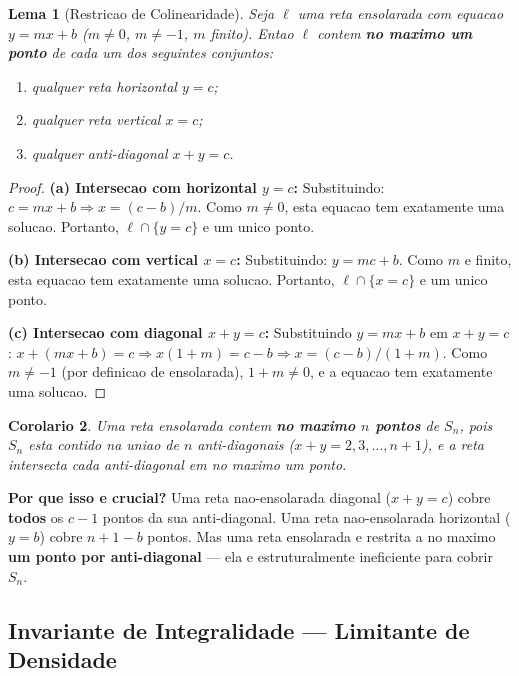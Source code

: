 \documentclass[5p]{elsarticle}
\newtheorem{lemma}{Lema}[section]
\newtheorem{corollary}[lemma]{Corolario}
\theoremstyle{definition}
\begin{document}
\begin{lemma}[Restricao de Colinearidade]\label{lem:restrict}
  Seja $\ell$ uma reta ensolarada com equacao $y = mx + b$ ($m \neq 0$, $m \neq -1$,
  $m$ finito). Entao $\ell$ contem \textbf{no maximo um ponto} de cada um dos seguintes
  conjuntos:
  \begin{enumerate}[label=(\alph*)]
    \item qualquer reta horizontal $y = c$;
    \item qualquer reta vertical $x = c$;
    \item qualquer anti-diagonal $x+y = c$.
  \end{enumerate}
\end{lemma}

\begin{proof}
  \textbf{(a) Intersecao com horizontal $y = c$:}
  Substituindo: $c = mx + b \Rightarrow x = (c-b)/m$. Como $m \neq 0$, esta equacao
  tem exatamente uma solucao. Portanto, $\ell \cap \{y = c\}$ e um unico ponto.

  \textbf{(b) Intersecao com vertical $x = c$:}
  Substituindo: $y = mc + b$. Como $m$ e finito, esta equacao tem exatamente uma
  solucao. Portanto, $\ell \cap \{x = c\}$ e um unico ponto.

  \textbf{(c) Intersecao com diagonal $x+y = c$:}
  Substituindo $y = mx+b$ em $x+y=c$: $x + (mx+b) = c \Rightarrow x(1+m) = c-b
  \Rightarrow x = (c-b)/(1+m)$. Como $m \neq -1$ (por definicao de ensolarada),
  $1+m \neq 0$, e a equacao tem exatamente uma solucao.
\end{proof}

\begin{corollary}\label{cor:max-anti}
  Uma reta ensolarada contem \textbf{no maximo $n$ pontos} de $S_n$, pois $S_n$ esta
  contido na uniao de $n$ anti-diagonais ($x+y = 2, 3, \dots, n+1$), e a reta
  intersecta cada anti-diagonal em no maximo um ponto.
\end{corollary}

\textbf{Por que isso e crucial?} Uma reta nao-ensolarada diagonal ($x+y = c$) cobre
\textbf{todos} os $c-1$ pontos da sua anti-diagonal. Uma reta nao-ensolarada horizontal
($y = b$) cobre $n+1-b$ pontos. Mas uma reta ensolarada e restrita a no maximo
\textbf{um ponto por anti-diagonal} — ela e estruturalmente ineficiente para cobrir
$S_n$.

\subsection{Invariante de Integralidade — Limitante de Densidade}
\end{document}
